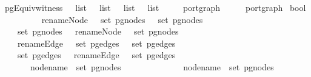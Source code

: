 \ pgEquiv{\isacharunderscore}witness\ {\isacharcolon}{\isacharcolon}\ {\isachardoublequoteopen}{\isacharparenleft}\ list\ {\isasymRightarrow}\ \ list{\isacharparenright}\ {\isasymRightarrow}\ {\isacharparenleft}\ list\ {\isasymRightarrow}\ \ list{\isacharparenright}\isanewline
{}\ {\isacharparenleft}\ \ \ \ port{\isacharunderscore}graph\ {\isasymRightarrow}\ {\isacharparenleft}\ \ \ \ port{\isacharunderscore}graph\isanewline
{}\ bool{\isachardoublequoteclose}\isanewline
\ \ \ {\isachardoublequoteopen}\ \ {\isasymequiv}\isanewline
\ \ \ \ renameNode\ \ {\isacharbackquote}\ {\isacharparenleft}set\ {\isacharparenleft}pg{\isacharunderscore}nodes\ \ {\isacharequal}\ set\ {\isacharparenleft}pg{\isacharunderscore}nodes\ \ {\isasymand}\isanewline
\ \ \ \ set\ {\isacharparenleft}pg{\isacharunderscore}nodes\ \ {\isacharequal}\ renameNode\ \ {\isacharbackquote}\ {\isacharparenleft}set\ {\isacharparenleft}pg{\isacharunderscore}nodes\ \ {\isasymand}\isanewline
\ \ \ \ renameEdge\ \ {\isacharbackquote}\ {\isacharparenleft}set\ {\isacharparenleft}pg{\isacharunderscore}edges\ \ {\isacharequal}\ set\ {\isacharparenleft}pg{\isacharunderscore}edges\ \ {\isasymand}\isanewline
\ \ \ \ set\ {\isacharparenleft}pg{\isacharunderscore}edges\ \ {\isacharequal}\ renameEdge\ \ {\isacharbackquote}\ {\isacharparenleft}set\ {\isacharparenleft}pg{\isacharunderscore}edges\ \ {\isasymand}\isanewline
\ \ \ \ {\isacharparenleft}{\isasymforall}\ \ {\isasymin}\ node{\isacharunderscore}name\ {\isacharbackquote}\ set\ {\isacharparenleft}pg{\isacharunderscore}nodes\ \ {\isasymlongrightarrow}\ \ {\isacharparenleft}\ {\isacharequal}\ \ {\isasymand}\isanewline
\ \ \ \ {\isacharparenleft}{\isasymforall}\ \ {\isasymin}\ node{\isacharunderscore}name\ {\isacharbackquote}\ set\ {\isacharparenleft}pg{\isacharunderscore}nodes\ \ {\isasymlongrightarrow}\ \ {\isacharparenleft}\ {\isacharequal}\ 
